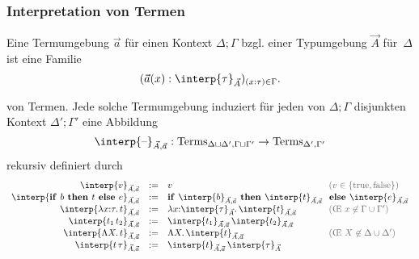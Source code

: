 \documentclass{beamer}
\newcommand{\defeq}{:=} %
\newcommand{\trueV}{\text{true}}
\newcommand{\falseV}{\text{false}}
\newcommand{\lam}[1]{\lambda #1.\,}
\newcommand{\Lam}[1]{\Lambda #1.\,}
\newcommand{\Terms}{\text{Terms}}
\newcommand{\blank}{\text{--}} %
\newcommand{\typeInterp}[2]{\interp{#2}_{#1}}
\newcommand{\termInterp}[3]{\interp{#3}_{#1, #2}}
\renewcommand{\emph}[1]{\textcolor{Emph}{#1}}
\newcommand{\info}[1]{\textcolor{dimgray}{#1}}
\begin{document}
\begin{frame}
  \frametitle{Interpretation von Termen}

  Eine \emph{Termumgebung} $\vec{a}$ für einen Kontext $\Delta; \Gamma$ bzgl. einer Typumgebung $\vec{A}$ für~$\Delta$ ist eine Familie
  \[ (\vec{a}(x) : \typeInterp{\vec{A}}{\tau})_{(x : \tau) \in \Gamma}. \]

  von Termen.
  Jede solche Termumgebung induziert für jeden von $\Delta;\Gamma$ disjunkten Kontext $\Delta';\Gamma'$ eine Abbildung
  \[ \termInterp{\vec{A}}{\vec{a}}{\blank} : \Terms_{\Delta \sqcup \Delta', \Gamma \sqcup \Gamma'} \to \Terms_{\Delta', \Gamma'} \]
  rekursiv definiert durch
  \[
    \begin{array}{r c l l}
      \termInterp{\vec{A}}{\vec{a}}{v} &\defeq& v & \info{(v \in \{ \trueV, \falseV \})} \\
      \termInterp{\vec{A}}{\vec{a}}{\text{\textbf{if }} b \text{\textbf{ then }} t \text{\textbf{ else }} e} &\defeq& \text{\textbf{if }} \termInterp{\vec{A}}{\vec{a}}{b} \text{\textbf{ then }} \termInterp{\vec{A}}{\vec{a}}{t} \!\!&\!\! \text{\textbf{ else }} \termInterp{\vec{A}}{\vec{a}}{e} \\
      \termInterp{\vec{A}}{\vec{a}}{\lam{x{:}\tau} t} &\defeq& \lam{x{:}\typeInterp{\vec{A}}{\tau}} \termInterp{\vec{A}}{\vec{a}}{t} & \text{\info{(\OE{} $x \not\in \Gamma \cup \Gamma'$)}} \\
      \termInterp{\vec{A}}{\vec{a}}{t_1 \, t_2} &\defeq& \termInterp{\vec{A}}{\vec{a}}{t_1} \, \termInterp{\vec{A}}{\vec{a}}{t_2} \\
      \termInterp{\vec{A}}{\vec{a}}{\Lam{X} t} &\defeq& \Lam{X} \termInterp{\vec{A}}{\vec{a}}{t} & \text{\info{(\OE{} $X \not\in \Delta \cup \Delta'$)}} \\
      \termInterp{\vec{A}}{\vec{a}}{t\,\tau} &\defeq& \termInterp{\vec{A}}{\vec{a}}{t}\,\typeInterp{\vec{A}}{\tau} \\
    \end{array}
  \]
\end{frame}
\end{document}
